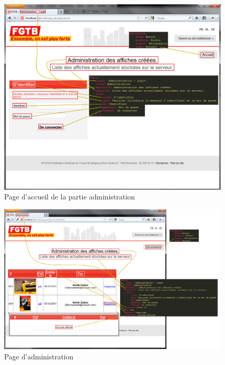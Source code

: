 \documentclass{article}
\begin{document}
\begin{sffamily}
\begin{figure}[!h]
\includegraphics[angle=-90,width=\textwidth]{messages_adminlogin.png}
\caption{Page d'accueil de la partie administration}
\end{figure}

\begin{figure}[!h]
\includegraphics[angle=-90,width=\textwidth]{messages_admin.png}
\caption{Page d'administration}
\end{figure}

\end{sffamily}
\end{document}
